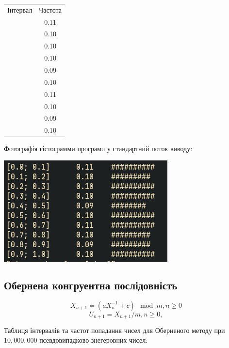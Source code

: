 \documentclass[a4paper,12pt]{report}
\begin{document}
\begin{table}[ht]
\centering %
\begin{tabular}{c c} %
  Інтервал & Частота \\\relax
  [0.0; 0.1] & 0.11 \\\relax
  [0.1; 0.2] & 0.10 \\\relax
  [0.2; 0.3] & 0.10 \\\relax
  [0.3; 0.4] & 0.10 \\\relax
  [0.4; 0.5] & 0.09 \\\relax
  [0.5; 0.6] & 0.10 \\\relax
  [0.6; 0.7] & 0.11 \\\relax
  [0.7; 0.8] & 0.10 \\\relax
  [0.8; 0.9] & 0.09 \\\relax
  [0.9; 1.0] & 0.10
\end{tabular}
\end{table}
Фотографія гістограмми програми у стандартний поток виводу:
\begin{center}\includegraphics[scale=0.5]{fibb}\end{center}


\subsection{Обернена конгруентна послідовність}
\[X_{n+1}=(aX_{n}^{-1}  + c)\mod m, n \ge 0\]
\[U_{n+1} = X_{n+1}/m, n\ge0, \]

Таблиця інтервалів та частот попадання чисел для Оберненого методу при $10,000,000$ псевдовипадково знегеровних чисел:
\end{document}
